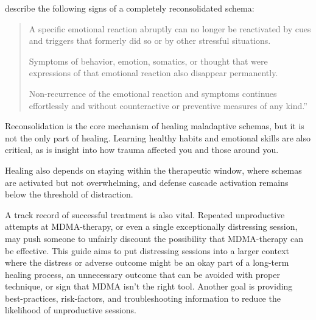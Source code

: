 \documentclass[12pt,letterpaper]{article}
\begin{document}
\textcite{eckerUnlocking} describe the following signs of a completely reconsolidated schema:
\begin{quotation}
    A specific emotional reaction abruptly can no longer be reactivated by cues and triggers that formerly did so or by other stressful situations.
    
    Symptoms of behavior, emotion, somatics, or thought that were expressions of that emotional reaction also disappear permanently.
    
    Non-recurrence of the emotional reaction and symptoms continues effortlessly and without counteractive or preventive measures of any kind.”
\end{quotation}

\vspace{\baselineskip}


Reconsolidation is the core mechanism of healing maladaptive schemas, but it is not the only part of healing. Learning healthy habits and emotional skills are also critical, as is insight into how trauma affected you and those around you.

Healing also depends on staying within the therapeutic window, where schemas are activated but not overwhelming, and defense cascade activation remains below the threshold of distraction.

A track record of successful treatment is also vital. Repeated unproductive attempts at MDMA-therapy, or even a single exceptionally distressing session, may push someone to unfairly discount the possibility that MDMA-therapy can be effective. This guide aims to put distressing sessions into a larger context where the distress or adverse outcome might be an okay part of a long-term healing process, an unnecessary outcome that can be avoided with proper technique, or sign that MDMA isn't the right tool. Another goal is providing best-practices, risk-factors, and troubleshooting information to reduce the likelihood of unproductive sessions.
\end{document}
